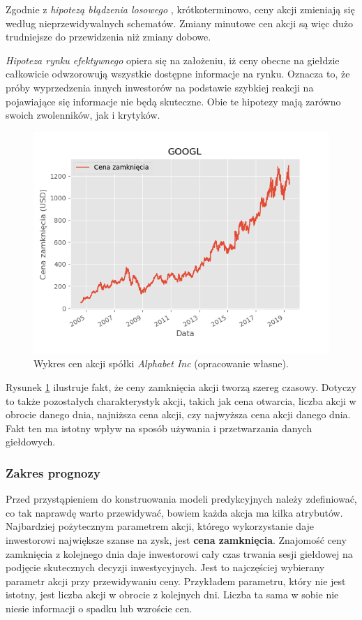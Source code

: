 \documentclass[a4paper, twoside, 11pt, openright]{article}
\begin{document}
 Zgodnie z \textit{hipotezą błądzenia losowego} \cite{randwalk}, krótkoterminowo, ceny akcji zmieniają się według nieprzewidywalnych schematów. Zmiany minutowe cen akcji są więc dużo trudniejsze do przewidzenia niż zmiany dobowe. 
 
 \textit{Hipoteza rynku efektywnego} \cite{efficientmarket} opiera się na założeniu, iż ceny obecne na giełdzie całkowicie odwzorowują wszystkie dostępne informacje na rynku. Oznacza to, że próby wyprzedzenia innych inwestorów na podstawie szybkiej reakcji na pojawiające się informacje nie będą skuteczne. Obie te hipotezy mają zarówno swoich zwolenników, jak i krytyków.

\begin{figure}[H]
\centering \includegraphics[scale=0.9]{img/GOOGL_adj_close.png}
\caption{Wykres cen akcji spółki \textit{Alphabet Inc} (opracowanie własne).}
\label{img:alphabet_history}
\end{figure}

Rysunek \ref{img:alphabet_history} ilustruje fakt, że ceny zamknięcia akcji tworzą szereg czasowy. Dotyczy to także pozostałych charakterystyk akcji, takich jak cena otwarcia, liczba akcji w obrocie danego dnia, najniższa cena akcji, czy najwyższa cena akcji danego dnia. Fakt ten ma istotny wpływ na sposób używania i przetwarzania danych giełdowych.

\subsubsection{Zakres prognozy}

Przed przystąpieniem do konstruowania modeli predykcyjnych należy zdefiniować, co tak naprawdę warto przewidywać, bowiem każda akcja ma kilka atrybutów. Najbardziej pożytecznym parametrem akcji, którego wykorzystanie daje inwestorowi największe szanse na zysk, jest \textbf{cena zamknięcia}. Znajomość ceny zamknięcia z kolejnego dnia daje inwestorowi cały czas trwania sesji giełdowej na podjęcie skutecznych decyzji inwestycyjnych. Jest to najczęściej wybierany parametr akcji przy przewidywaniu ceny. Przykładem parametru, który nie jest istotny, jest liczba akcji w obrocie z kolejnych dni. Liczba ta sama w sobie nie niesie informacji o spadku lub wzroście cen.
\end{document}
